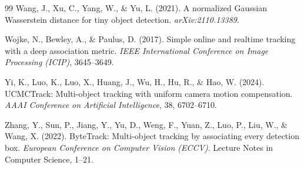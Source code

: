\documentclass[12pt,a4paper,oneside]{report}
\begin{document}
\begin{thebibliography}{99}
Wang, J., Xu, C., Yang, W., \& Yu, L. (2021).
A normalized Gaussian Wasserstein distance for tiny object detection.
\textit{arXiv:2110.13389}.

Wojke, N., Bewley, A., \& Paulus, D. (2017).
Simple online and realtime tracking with a deep association metric.
\textit{IEEE International Conference on Image Processing (ICIP)}, 3645--3649.

Yi, K., Luo, K., Luo, X., Huang, J., Wu, H., Hu, R., \& Hao, W. (2024).
UCMCTrack: Multi-object tracking with uniform camera motion compensation.
\textit{AAAI Conference on Artificial Intelligence}, 38, 6702--6710.

Zhang, Y., Sun, P., Jiang, Y., Yu, D., Weng, F., Yuan, Z., Luo, P., Liu, W., \& Wang, X. (2022).
ByteTrack: Multi-object tracking by associating every detection box.
\textit{European Conference on Computer Vision (ECCV)}. Lecture Notes in Computer Science, 1--21.

\end{thebibliography}
\end{document}
